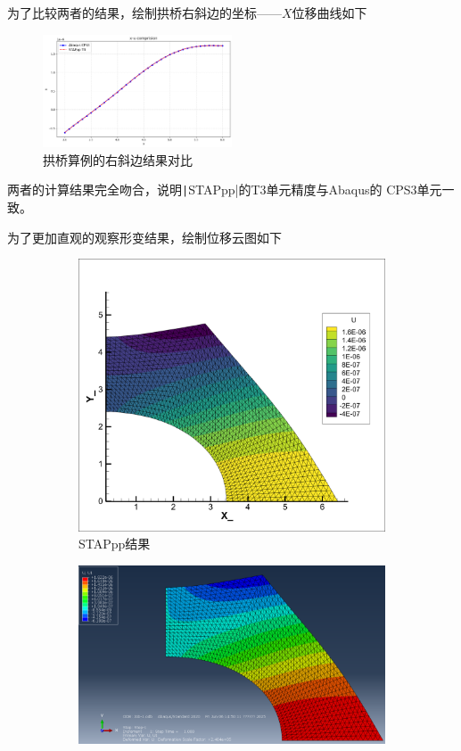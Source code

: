 \documentclass[12pt,a4paper]{article}
\newcommand{\code}{\texttt}
\begin{document}
为了比较两者的结果，绘制拱桥右斜边的坐标——$X$位移曲线如下
\begin{figure}[H]
    \centering
    \includegraphics[width=0.5\textwidth]{comparison.png}
    \caption{拱桥算例的右斜边结果对比}
\end{figure}
两者的计算结果完全吻合，说明\code|STAPpp|的T3单元精度与Abaqus的
CPS3单元一致。

为了更加直观的观察形变结果，绘制位移云图如下
\begin{figure}[H]
    \centering
    \begin{subfigure}{0.6\textwidth}  %
        \includegraphics[width=\linewidth]{valiadtion.png}
        \caption{STAPpp结果}
        \label{fig:subfig1}
    \end{subfigure}
    \hfill  %
    \begin{subfigure}{0.6\textwidth}
        \includegraphics[width=\linewidth]{abaqus.png}

\end{subfigure}
\end{figure}
\end{document}
